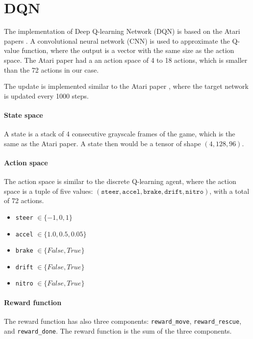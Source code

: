 \documentclass{article}
\begin{document}
\section{DQN}

The implementation of Deep Q-learning Network (DQN) is based on the Atari papers \citep{mnih, mnih2}. A convolutional neural network (CNN) is used to approximate the Q-value function, where the output is a vector with the same size as the action space. The Atari paper \citep{mnih} had a an action space of 4 to 18 actions, which is smaller than the 72 actions in our case.

The update is implemented similar to the Atari paper \citep{mnih}, where the target network is updated every 1000 steps.

\paragraph{State space}

A state is a stack of 4 consecutive grayscale frames of the game, which is the same as the Atari paper. A state then would be a tensor of shape $(4, 128, 96)$.

\paragraph{Action space}

The action space is similar to the discrete Q-learning agent, where the action space is a tuple of five values: $(\texttt{steer}, \texttt{accel}, \texttt{brake}, \texttt{drift}, \texttt{nitro})$, with a total of 72 actions.

\begin{itemize}
    \item \texttt{steer}  $\in \{-1, 0, 1\}$
    \item \texttt{accel} $\in \{1.0, 0.5, 0.05\}$
    \item \texttt{brake} $\in \{False, True\}$
    \item \texttt{drift} $\in \{False, True\}$
    \item \texttt{nitro} $\in \{False, True\}$
\end{itemize}

\paragraph{Reward function}

The reward function has also three components: \texttt{reward\_move}, \texttt{reward\_rescue}, and \texttt{reward\_done}. The reward function is the sum of the three components.
\end{document}

